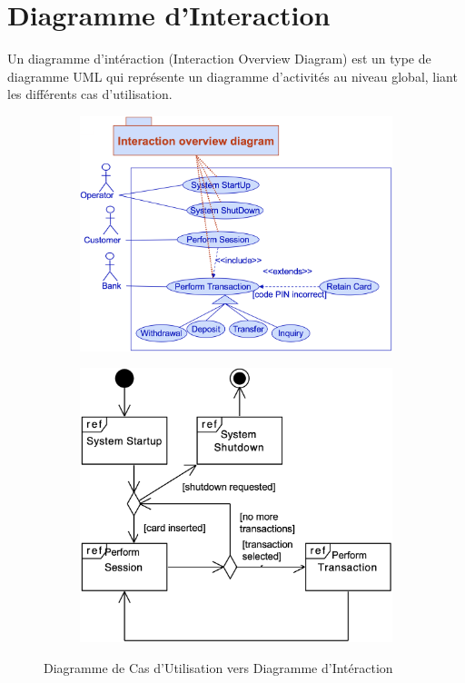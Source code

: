 \section{Diagramme d'Interaction}\label{sec:diagramme_interaction}
\begin{definition}
	Un diagramme d'intéraction (Interaction Overview Diagram) est un type de diagramme UML qui représente un diagramme d'activités au niveau global, liant les différents cas d'utilisation.
\end{definition}

\begin{figure}[H]
	\centering
\begin{subfigure}{0.45\textwidth}
	\includegraphics[width=\textwidth]{./Images/Diagrammes/diagram_interaction_ex_atm_usecase.png}
\end{subfigure}
\hfill
\begin{subfigure}{0.45\textwidth}
	\includegraphics[width=\textwidth]{./Images/Diagrammes/diagram_interaction_ex_atm.png}
\end{subfigure}
\caption{Diagramme de Cas d'Utilisation vers Diagramme d'Intéraction}
\end{figure}